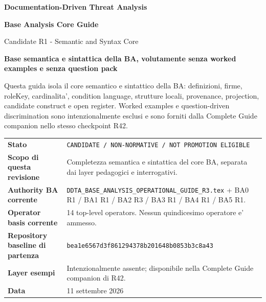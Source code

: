 \documentclass[11pt,a4paper]{article}
\begin{document}

\begin{titlepage}
\thispagestyle{empty}
\vspace*{8mm}
{\sffamily\bfseries\color{DDTANavy}\fontsize{15}{18}\selectfont Documentation-Driven Threat Analysis}\par
\vspace{5mm}
{\sffamily\bfseries\color{DDTANavy}\fontsize{29}{33}\selectfont Base Analysis Core Guide}\par
\vspace{2mm}
{\sffamily\color{DDTABlue}\fontsize{18}{22}\selectfont Candidate R1 - Semantic and Syntax Core}\par

\vspace{9mm}
\begin{tcolorbox}[enhanced,arc=3pt,boxrule=0pt,colback=DDTANavy,left=12pt,right=12pt,top=11pt,bottom=11pt]
{\color{white}\sffamily\bfseries\large Base semantica e sintattica della BA, volutamente senza worked examples e senza question pack}\par
\vspace{2mm}
{\color{white!88}\small Questa guida isola il core semantico e sintattico della BA: definizioni, firme, roleKey, cardinalita', condition language, strutture locali, provenance, projection, candidate construct e open register. Worked examples e question-driven discrimination sono intenzionalmente esclusi e sono forniti dalla Complete Guide companion nello stesso checkpoint R42.}
\end{tcolorbox}

\vspace{8mm}
\begin{tabularx}{\textwidth}{L{47mm}Y}
\toprule
\textbf{Stato} & \texttt{CANDIDATE / NON-NORMATIVE / NOT PROMOTION ELIGIBLE} \\
\textbf{Scopo di questa revisione} & Completezza semantica e sintattica del core BA, separata dai layer pedagogici e interrogativi. \\
\textbf{Authority BA corrente} & \texttt{DDTA\_BASE\_ANALYSIS\_OPERATIONAL\_GUIDE\_R3.tex} + BA0 R1 / BA1 R1 / BA2 R3 / BA3 R1 / BA4 R1 / BA5 R1. \\
\textbf{Operator basis corrente} & 14 top-level operators. Nessun quindicesimo operatore e' ammesso. \\
\textbf{Repository baseline di partenza} & \texttt{bea1e6567d3f861294378b201648b0853b3c8a43} \\
\textbf{Layer esempi} & Intenzionalmente assente; disponibile nella Complete Guide companion di R42. \\
\textbf{Data} & 11 settembre 2026 \\
\bottomrule
\end{tabularx}


\end{titlepage}
\end{document}
